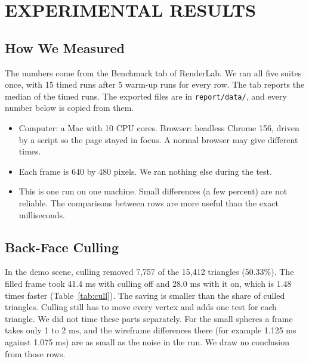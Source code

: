 \chapter{EXPERIMENTAL RESULTS}\nonum

\section{How We Measured}
The numbers come from the Benchmark tab of RenderLab. We ran all five suites once, with 15 timed runs after 5 warm-up runs for every row. The tab reports the median of the timed runs. The exported files are in \texttt{report/data/}, and every number below is copied from them.

\begin{itemize}
\item Computer: a Mac with 10 CPU cores. Browser: headless Chrome 156, driven by a script so the page stayed in focus. A normal browser may give different times.
\item Each frame is 640 by 480 pixels. We ran nothing else during the test.
\item This is one run on one machine. Small differences (a few percent) are not reliable. The comparisons between rows are more useful than the exact milliseconds.
\end{itemize}

\section{Back-Face Culling}
In the demo scene, culling removed 7,757 of the 15,412 triangles (50.33\%). The filled frame took 41.4 ms with culling off and 28.0 ms with it on, which is 1.48 times faster (Table~\ref{tab:cull}). The saving is smaller than the share of culled triangles. Culling still has to move every vertex and adds one test for each triangle. We did not time these parts separately. For the small spheres a frame takes only 1 to 2 ms, and the wireframe differences there (for example 1.125 ms against 1.075 ms) are as small as the noise in the run. We draw no conclusion from those rows.

